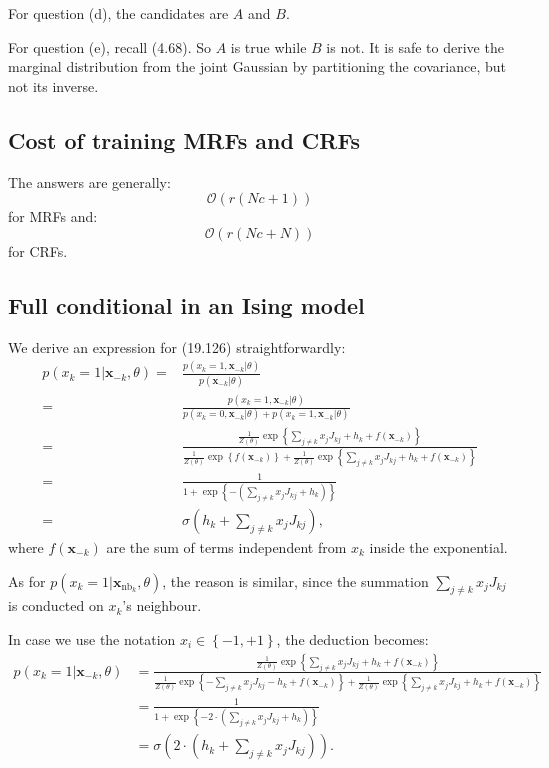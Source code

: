 \documentclass[UTF8]{ctexart}
\begin{document}
For question (d), the candidates are $A$ and $B$. 


For question (e), recall (4.68). 
So $A$ is true while $B$ is not. 
It is safe to derive the marginal distribution from the joint Gaussian by partitioning the covariance, but not its inverse. 


\subsection{Cost of training MRFs and CRFs}
The answers are generally:
$$\mathcal{O}(r(Nc+1))$$
for MRFs and:
$$\mathcal{O}(r(Nc+N))$$
for CRFs.

\subsection{Full conditional in an Ising model}
We derive an expression for (19.126) straightforwardly:
$$
\begin{aligned}
p(x_{k}=1|\textbf{x}_{-k},\theta)=&\frac{p(x_{k}=1,\textbf{x}_{-k}|\theta)}{p(\textbf{x}_{-k}|\theta)} \\
=&\frac{p(x_{k}=1,\textbf{x}_{-k}|\theta)}{p(x_{k}=0,\textbf{x}_{-k}|\theta)+p(x_{k}=1,\textbf{x}_{-k}|\theta)} \\
=&\frac{\frac{1}{Z(\theta)}\exp\left\{\sum_{j\neq k}x_{j}J_{kj}+h_{k}+f(\textbf{x}_{-k}) \right\}}{\frac{1}{Z(\theta)}\exp\left\{f(\textbf{x}_{-k}) \right\}+\frac{1}{Z(\theta)}\exp\left\{\sum_{j\neq k}x_{j}J_{kj}+h_{k}+f(\textbf{x}_{-k}) \right\}} \\
=&\frac{1}{1+\exp\left\{-\left(\sum_{j\neq k}x_{j}J_{kj}+h_{k}\right) \right\}} \\
=&\sigma\left(h_{k}+\sum_{j\neq k}x_{j}J_{kj}\right), 
\end{aligned}
$$
where $f(\textbf{x}_{-k})$ are the sum of terms independent from $x_{k}$ inside the exponential. 

As for $p(x_{k}=1|\textbf{x}_{\text{nb}_{k}},\theta)$, the reason is similar, since the summation $\sum_{j\neq k}x_{j}J_{kj}$ is conducted on $x_{k}$'s neighbour. 

In case we use the notation $x_{i}\in\left\{-1,+1 \right\}$, the deduction becomes:
$$
\begin{aligned}
p(x_{k}=1|\textbf{x}_{-k},\theta)&=\frac{\frac{1}{Z(\theta)}\exp\left\{\sum_{j\neq k}x_{j}J_{kj}+h_{k}+f(\textbf{x}_{-k}) \right\}}{\frac{1}{Z(\theta)}\exp\left\{-\sum_{j\neq k}x_{j}J_{kj}-h_{k}+f(\textbf{x}_{-k}) \right\}+\frac{1}{Z(\theta)}\exp\left\{\sum_{j\neq k}x_{j}J_{kj}+h_{k}+f(\textbf{x}_{-k}) \right\}} \\
&=\frac{1}{1+\exp\left\{-2\cdot\left(\sum_{j\neq k}x_{j}J_{kj}+h_{k}\right) \right\}}\\
&=\sigma\left(2\cdot\left(h_{k}+\sum_{j\neq k}x_{j}J_{kj}\right)\right).
\end{aligned}
$$
\end{document}
